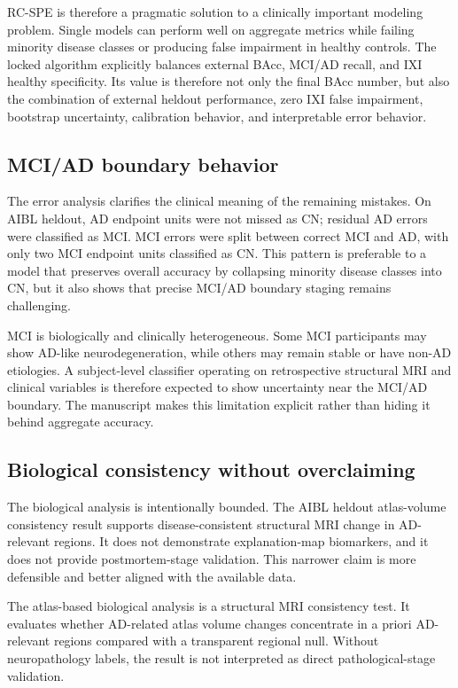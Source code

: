 \documentclass[12pt,a4paper]{article}
\begin{document}
RC-SPE is therefore a pragmatic solution to a clinically important modeling problem. Single models can perform well on aggregate metrics while failing minority disease classes or producing false impairment in healthy controls. The locked algorithm explicitly balances external BAcc, MCI/AD recall, and IXI healthy specificity. Its value is therefore not only the final BAcc number, but also the combination of external heldout performance, zero IXI false impairment, bootstrap uncertainty, calibration behavior, and interpretable error behavior.

\subsection{MCI/AD boundary behavior}
\label{sec:discussion_errors}

The error analysis clarifies the clinical meaning of the remaining mistakes. On AIBL heldout, AD endpoint units were not missed as CN; residual AD errors were classified as MCI. MCI errors were split between correct MCI and AD, with only two MCI endpoint units classified as CN. This pattern is preferable to a model that preserves overall accuracy by collapsing minority disease classes into CN, but it also shows that precise MCI/AD boundary staging remains challenging.

MCI is biologically and clinically heterogeneous. Some MCI participants may show AD-like neurodegeneration, while others may remain stable or have non-AD etiologies. A subject-level classifier operating on retrospective structural MRI and clinical variables is therefore expected to show uncertainty near the MCI/AD boundary. The manuscript makes this limitation explicit rather than hiding it behind aggregate accuracy.

\subsection{Biological consistency without overclaiming}
\label{sec:discussion_bio}

The biological analysis is intentionally bounded. The AIBL heldout atlas-volume consistency result supports disease-consistent structural MRI change in AD-relevant regions. It does not demonstrate explanation-map biomarkers, and it does not provide postmortem-stage validation. This narrower claim is more defensible and better aligned with the available data.

The atlas-based biological analysis is a structural MRI consistency test. It evaluates whether AD-related atlas volume changes concentrate in a priori AD-relevant regions compared with a transparent regional null. Without neuropathology labels, the result is not interpreted as direct pathological-stage validation.
\end{document}
